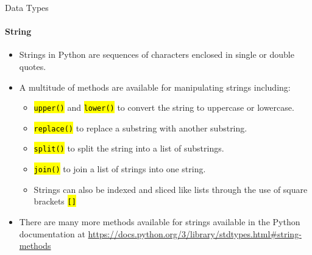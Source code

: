 \documentclass[
    aspectratio=169, 
    usepdftitle=false, 
    xcolor={dvipsnames},
    hyperref={
        colorlinks,
        linkcolor=black,
        urlcolor=blue}
    ]{beamer}
\let\OldTexttt\texttt
\renewcommand{\texttt}[1]{\OldTexttt{\hl{#1}}}%
\begin{document}
\begin{frame}[fragile]{Data Types}
    \framesubtitle{String}
    \begin{itemize}
        \item Strings in Python are sequences of characters enclosed in single or double quotes.
        \item A multitude of methods are available for manipulating strings including:
              \begin{itemize}
                  \item \texttt{upper()} and \texttt{lower()} to convert the string to uppercase or lowercase.
                  \item \texttt{replace()} to replace a substring with another substring.
                  \item \texttt{split()} to split the string into a list of substrings.
                  \item \texttt{join()} to join a list of strings into one string.
                  \item Strings can also be indexed and sliced like lists through the use of square brackets \texttt{[]}
              \end{itemize}
        \item There are many more methods available for strings available in the Python documentation at \url{https://docs.python.org/3/library/stdtypes.html#string-methods}
    \end{itemize}
\end{frame}
\end{document}
